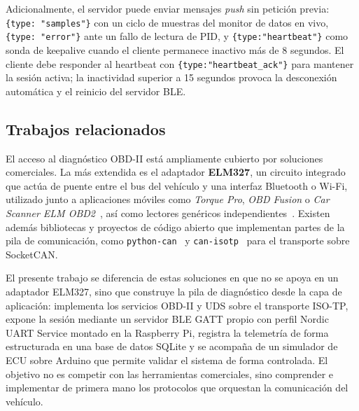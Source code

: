 \begin{table}[!htbp]
\caption{Estructura genérica de los mensajes NDJSON del protocolo sobre NUS. Cada objeto se serializa en una línea ASCII terminada en \texttt{\textbackslash n}.}
\label{tab:ndjson_struct}

\end{table}

Adicionalmente, el servidor puede enviar mensajes \textit{push} sin petición previa: \texttt{\{type: "samples"\}} con un ciclo de muestras del monitor de datos en vivo, \texttt{\{type: "error"\}} ante un fallo de lectura de PID, y \texttt{\{type:"heartbeat"\}} como sonda de keepalive cuando el cliente permanece inactivo más de 8 segundos. El cliente debe responder al heartbeat con \texttt{\{type:"heartbeat\_ack"\}} para mantener la sesión activa; la inactividad superior a 15 segundos provoca la desconexión automática y el reinicio del servidor BLE.

\subsection{Trabajos relacionados}
\label{sec:trabajos_relacionados}

El acceso al diagnóstico OBD-II está ampliamente cubierto por soluciones comerciales. La más extendida es el adaptador \textbf{ELM327}, un circuito integrado que actúa de puente entre el bus del vehículo y una interfaz Bluetooth o Wi-Fi, utilizado junto a aplicaciones móviles como \textit{Torque Pro}, \textit{OBD Fusion} o \textit{Car Scanner ELM OBD2}~\cite{CarScanner_app}, así como lectores genéricos independientes~\cite{KONWEII_scanner}. Existen además bibliotecas y proyectos de código abierto que implementan partes de la pila de comunicación, como \texttt{python-can}~\cite{Twiss23-pythoncan} y \texttt{can-isotp}~\cite{Menager23-isotp} para el transporte sobre SocketCAN.

El presente trabajo se diferencia de estas soluciones en que no se apoya en un adaptador ELM327, sino que construye la pila de diagnóstico desde la capa de aplicación: implementa los servicios OBD-II y UDS sobre el transporte ISO-TP, expone la sesión mediante un servidor BLE GATT propio con perfil Nordic UART Service montado en la Raspberry Pi, registra la telemetría de forma estructurada en una base de datos SQLite y se acompaña de un simulador de ECU sobre Arduino que permite validar el sistema de forma controlada. El objetivo no es competir con las herramientas comerciales, sino comprender e implementar de primera mano los protocolos que orquestan la comunicación del vehículo.

